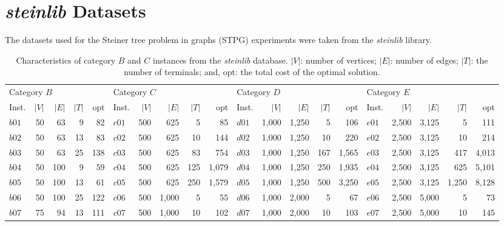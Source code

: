 \documentclass[journal]{IEEEtran}
\begin{document}
\section{\emph{steinlib} Datasets}\label{app:stein_data}
The datasets used for the Steiner tree problem in graphs (STPG) experiments were taken from the \emph{steinlib}\cite{steinlib} library.

\begin{table}[h]
\centering
\caption[Characteristics of category $B$, $C$, $D$ and $E$ instances from the \textit{steinlib} database]{Characteristics of category $B$ and $C$ instances from the \textit{steinlib} database. $|V|$: number of vertices; $|E|$: number of edges; $|T|$: the number of terminals; and,
         opt: the total cost of the optimal solution.}\label{tab:stpgprobs1}
\begin{adjustbox}{width=\textwidth}
\begin{tabular}{lrrrr|lrrrr|lrrrr|lrrrr} \toprule
\multicolumn{5}{l}{Category $B$} & \multicolumn{5}{l}{Category $C$}&\multicolumn{5}{l}{Category $D$} & \multicolumn{5}{l}{Category $E$}\\ 
\cmidrule(lr){1-5} \cmidrule(lr){6-10}\cmidrule(lr){11-15}\cmidrule(lr){16-20}
Inst.&$|V|$&$|E|$&$|T|$&opt& Inst.&$|V|$&$|E|$&$|T|$&opt&Inst.&$|V|$&$|E|$&$|T|$&opt& Inst.&$|V|$&$|E|$&$|T|$&opt\\ \hline
$b01$ & 50 & 63 & 9 & 82 & $c01$ & 500 & 625 & 5 & 85&  $d01$ & 1,000 & 1,250 & 5 & 106 & $e01$ & 2,500 & 3,125 & 5 & 111\\
$b02$ & 50 & 63 & 13 & 83& $c02$ & 500 & 625 & 10 & 144&  $d02$ & 1,000 & 1,250 & 10 & 220 & $e02$ & 2,500 & 3,125 & 10 & 214\\
$b03$ & 50 & 63 & 25 & 138& $c03$ & 500 & 625 & 83 & 754&  $d03$ & 1,000 & 1,250 & 167 & 1,565& $e03$ & 2,500 & 3,125 & 417 & 4,013\\
$b04$ & 50 & 100 & 9 & 59& $c04$ & 500 & 625 & 125 & 1,079&  $d04$ & 1,000 & 1,250 & 250 & 1,935& $e04$ & 2,500 & 3,125 & 625 & 5,101\\
$b05$ & 50 & 100 & 13 & 61& $c05$ & 500 & 625 & 250 & 1,579&  $d05$ & 1,000 & 1,250 & 500 & 3,250& $e05$ & 2,500 & 3,125 & 1,250 & 8,128\\
$b06$ & 50 & 100 & 25 & 122& $c06$ & 500 & 1,000 & 5 & 55&  $d06$ & 1,000 & 2,000 & 5 & 67& $e06$ & 2,500 & 5,000 & 5 & 73\\
$b07$ & 75 & 94 & 13 & 111& $c07$ & 500 & 1,000 & 10 & 102&  $d07$ & 1,000 & 2,000 & 10 & 103& $e07$ & 2,500 & 5,000 & 10 & 145\\

\end{tabular}
\end{adjustbox}
\end{table}
\end{document}
